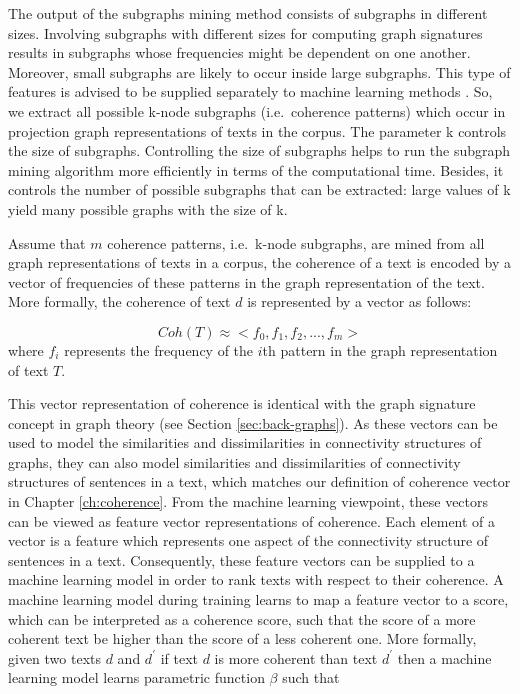 The output of the subgraphs mining method consists of subgraphs in different sizes.   
Involving subgraphs with different sizes for computing graph signatures results in subgraphs whose frequencies might be dependent on one another. 
Moreover, small subgraphs are likely to occur inside large subgraphs. 
This type of features is advised to be supplied separately to machine learning methods \cite{aggarwalcharu18}. 
So, we extract all possible k-node subgraphs (i.e.\ coherence patterns) which occur in projection graph representations of texts in the corpus. 
The parameter k controls the size of subgraphs.  
Controlling the size of subgraphs helps to run the subgraph mining algorithm more efficiently in terms of the computational time.
Besides, it controls the number of possible subgraphs that can be extracted: large values of k yield many possible graphs with the size of k. 

Assume that $m$ coherence patterns, i.e.\ k-node subgraphs, are mined from all graph representations of texts in a corpus, the coherence of a text is encoded by a vector of frequencies of these patterns in the graph representation of the text. 
More formally, the coherence of  text $d$ is represented by a vector as follows: 

\begin{equation}
Coh(T) \approx <f_0,f_1,f_2,...,f_m>
\end{equation}
where $f_i$ represents the frequency of the $i${th} pattern in the graph representation of text $T$. 

This vector representation of coherence is identical with the graph signature concept in graph theory (see Section \ref{sec:back-graphs}). 
As these vectors can be used to model the similarities and dissimilarities in connectivity structures of graphs, they can also model similarities and dissimilarities of connectivity structures of sentences in a text, which matches our definition of coherence vector in Chapter \ref{ch:coherence}.   
From the machine learning viewpoint, these vectors can be viewed as feature vector representations of coherence. 
Each element of a vector is a feature which represents one aspect of the connectivity structure of sentences in a text. 
Consequently, these feature vectors can be supplied to a machine learning model in order to rank texts with respect to their coherence. 
A machine learning model during training learns to map a feature vector to a score, which can be interpreted as a coherence score, such that the score of a more coherent text be higher than the score of a less coherent one. 
More formally, given two texts $d$ and $d^\prime$ if text $d$ is more coherent than text $d^\prime$ then a machine learning model learns parametric function $\beta$ such that 

